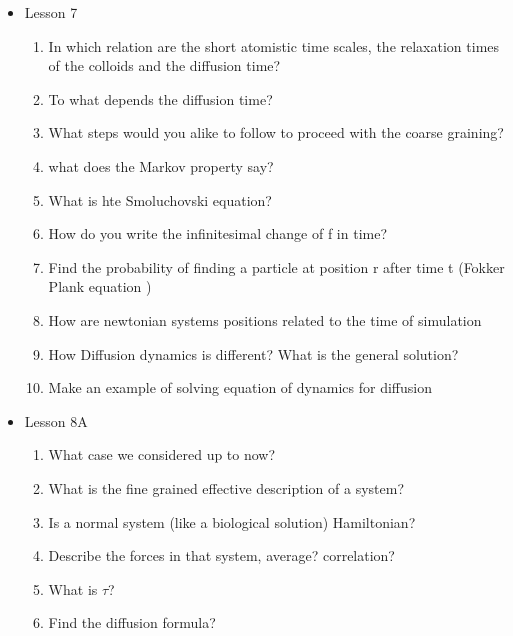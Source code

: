 {\begin{itemize}
\begin{enumerate}
        \item What if a transition is rejected? 
        \item What is a sweep? When is an operation of order n? (make use of the example with the spins)
        \item When do you prefer to use Markov chains? instead of Molecular Dynamics?
        \item What is the difference between Markov chains and Molecular Dynamics?
    \end{enumerate}
    \item Lesson 7
    \begin{enumerate}
        \item In which relation are the short atomistic time scales, the relaxation times of the colloids and the diffusion time?
        \item To what depends the diffusion time?
        \item What steps would you alike to follow to proceed with the coarse graining?
        \item what does the Markov property say?
        \item What is hte Smoluchovski equation?
        \item How do you write the infinitesimal change of f in time?
        \item Find the probability of finding a particle at position r after time t (Fokker Plank equation )
        \item How are newtonian systems positions related to the time of simulation
        \item How Diffusion dynamics is different? What is the general solution?
        \item Make an example of solving equation of dynamics for diffusion
    \end{enumerate}
    \item Lesson 8A
    \begin{enumerate}
        \item What case we considered up to now?
        \item What is the fine grained effective description of a system?
        \item Is a normal system (like a biological solution) Hamiltonian?
        \item Describe the forces in that system, average? correlation?
        \item What is $\tau$?
        \item Find the diffusion formula?

\end{enumerate}
\end{itemize}}
